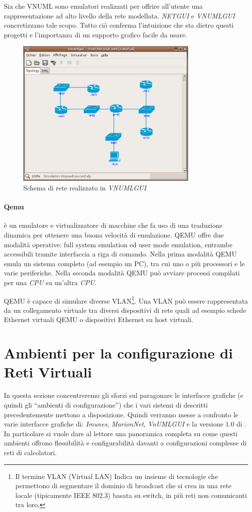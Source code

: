 Sia \netkit{} che VNUML sono emulatori realizzati per offrire all'utente una rappresentazione ad alto livello della rete modellata. \emph{NETGUI} e \emph{VNUMLGUI} concretizzano tale scopo. Tutto ciò conferma l'intuizione che sta dietro questi progetti e l'importanza di un supporto grafico facile da usare.

\begin{figure}[!ht]
	\centering
	\includegraphics[width=9cm]{images/vnumlgui.png}
	\caption{Schema di rete realizzato in \emph{VNUMLGUI}}
	\label{figura:vnumlgui}
\end{figure}

\paragraph{Qemu}\cite{QUATC05} è un emulatore e virtualizzatore di macchine che fa uso di una traduzione dinamica per ottenere una buona velocità di emulazione. QEMU offre due modalità operative: full system emulation ed user mode emulation, entrambe accessibili tramite interfaccia a riga di comando. Nella prima modalità QEMU emula un sistema completo (ad esempio un PC), tra cui uno o più processori e le varie periferiche. Nella seconda modalità QEMU può avviare processi compilati per una \emph{CPU} su un'altra \emph{CPU}.

QEMU è capace di simulare diverse VLAN\footnote{Il termine VLAN (Virtual LAN) Indica un insieme di tecnologie che permettono di segmentare il dominio di broadcast che si crea in una rete locale (tipicamente IEEE 802.3) basata su switch, in più reti non comunicanti tra loro.}. Una VLAN può essere rappresentata da un collegamento virtuale tra diversi dispositivi di rete quali ad esempio schede Ethernet virtuali QEMU o dispositivi Ethernet su host virtuali.

\section{Ambienti per la configurazione di Reti Virtuali}
In questa sezione concentreremo gli sforzi sul paragonare le interfacce grafiche (e quindi gli ``ambienti di configurazione'') che i vari sistemi di \emulazione{} descritti precedentemente mettono a disposizione. Quindi verranno messe a confronto le varie interfacce grafiche di: \emph{Imunes}, \emph{MarionNet}, \emph{VnUMLGUI} e la versione $1.0$ di \visualnetkit{}. In particolare si vuole dare al lettore una panoramica completa su come questi ambienti offrono flessibilità e configurabilità davanti a configurazioni complesse di reti di calcolatori.

